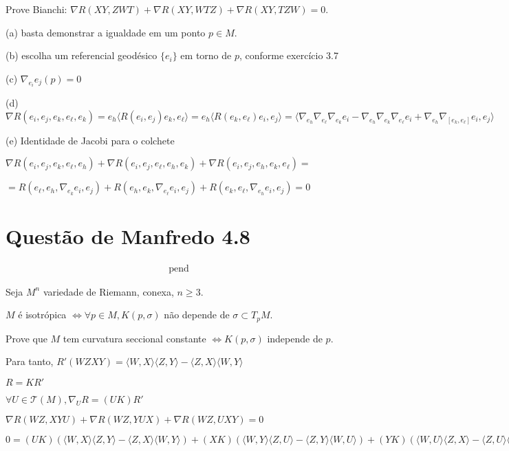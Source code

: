 \documentclass[10pt,a4paper]{article}
\begin{document}
		Prove Bianchi: $\nabla R(XY, ZWT) + \nabla R(XY, WTZ) + \nabla R(XY, TZW) = 0$.

		(a) basta demonstrar a igualdade em um ponto $p \in M$.

		(b) escolha um referencial geod\'esico $\{ e_i \}$ em torno de $p$, conforme exerc\'icio 3.7

		(c) $\nabla_{e_i} e_j (p) = 0$

		(d) $\nabla R(e_i, e_j, e_k, e_\ell, e_k) = e_h \langle R(e_i, e_j) e_k, e_\ell \rangle = e_h \langle R(e_k, e_\ell) e_i, e_j \rangle = \langle \nabla_{e_h} \nabla_{e_\ell} \nabla_{e_k} e_i - \nabla_{e_h} \nabla_{e_k} \nabla_{e_\ell} e_i + \nabla_{e_h} \nabla_{[ e_k, e_\ell ]} e_i, e_j \rangle$

		(e) Identidade de Jacobi para o colchete

		$\nabla R(e_i, e_j, e_k, e_\ell, e_h) + \nabla R(e_i, e_j, e_\ell, e_h, e_k) + \nabla R(e_i, e_j, e_h, e_k, e_\ell) = $

		$ = R(e_\ell, e_h, \nabla_{e_k} e_i, e_j) + R(e_h, e_k, \nabla_{e_\ell} e_i, e_j) + R(e_k, e_\ell, \nabla_{e_h} e_i, e_j) = 0$

	\section{Quest\~ao de Manfredo 4.8}
		\begin{flushright}
		\end{flushright}

		\begin{align}
		\text{pend}
		\end{align}

		Seja $M^n$ variedade de Riemann, conexa, $n \ge 3$.

		$M$ \'e isotr\'opica $\Leftrightarrow \forall p \in M, K(p, \sigma)$ n\~ao depende de $\sigma \subset T_pM$.

		Prove que $M$ tem curvatura seccional constante $\Leftrightarrow K(p, \sigma)$ independe de $p$.

		Para tanto, $R'(WZXY) = \langle W, X \rangle \langle Z, Y \rangle - \langle Z, X \rangle \langle W, Y \rangle $

		$R = KR'$

		$\forall U \in \mathcal{T}(M), \nabla_U R = (UK)R'$

		$\nabla R(WZ, XYU) + \nabla R(WZ, YUX) + \nabla R(WZ, UXY) = 0$

		$0 = (UK) (\langle W, X \rangle \langle Z, Y \rangle - \langle Z, X \rangle \langle W, Y \rangle) + (XK)(\langle W, Y \rangle \langle Z, U \rangle - \langle Z, Y \rangle \langle W, U \rangle) + (YK)(\langle W, U \rangle \langle Z, X \rangle - \langle Z, U \rangle \langle W, X \rangle)$
\end{document}
